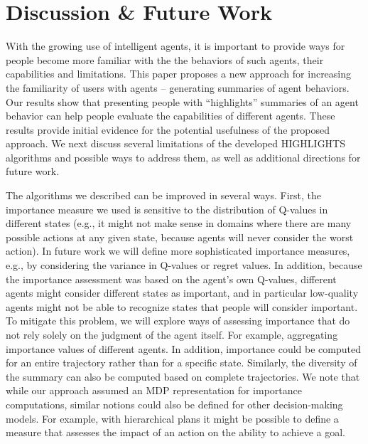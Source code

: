 \section{Discussion \& Future Work}
\label{sec:disc}
With the growing use of intelligent agents, it is important to provide ways for people become more familiar with the the behaviors of such agents, their capabilities and limitations. This paper proposes a new approach for increasing the familiarity of users with agents -- generating summaries of agent behaviors. Our results show that presenting people with ``highlights'' summaries of an agent behavior can help people evaluate the capabilities of different agents. These results provide initial evidence for the potential usefulness of the proposed approach. We next discuss several limitations of the developed HIGHLIGHTS algorithms and possible ways to address them, as well as additional directions for future work. 

The algorithms we described can be improved in several ways. First, the importance measure we used is sensitive to the distribution of Q-values in different states (e.g., it might not make sense in domains where there are many possible actions at any given state, because agents will never consider the worst action). In future work we will define more sophisticated importance measures, e.g., by considering the variance in 
Q-values or regret values. In addition, because the importance assessment was based on the agent's own Q-values, different agents might consider different states as important, and in particular low-quality agents might not be able to recognize states that people will consider important. To mitigate this problem, we will explore ways of assessing importance that do not rely solely on the judgment of the agent itself. For example, aggregating importance values of different agents. In addition, importance could be computed for an entire trajectory rather than for a specific state. Similarly, the diversity of the summary can also be computed based on complete trajectories. We note that while our approach assumed an MDP representation for importance computations, similar notions could also be defined for other decision-making models. For example, with hierarchical plans it might be possible to define a measure that assesses the impact of an action on the ability to achieve a goal.


